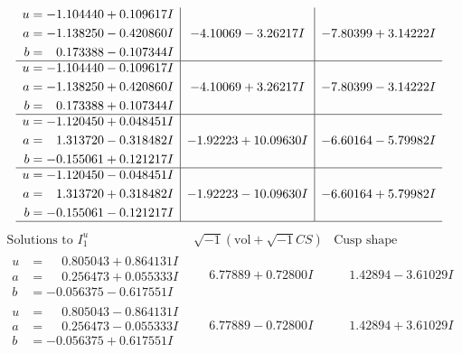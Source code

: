 \documentclass[1p]{elsarticle_modified}
\theoremstyle{definition}
\newcommand{\I}{\sqrt{-1}}
\begin{document}
$$\begin{array}{c|c|c}
\begin{aligned}
u &= -1.104440 + 0.109617 I \\
a &= -1.138250 - 0.420860 I \\
b &= \phantom{-}0.173388 - 0.107344 I\end{aligned}
 & -4.10069 - 3.26217 I & -7.80399 + 3.14222 I \\ \hline\begin{aligned}
u &= -1.104440 - 0.109617 I \\
a &= -1.138250 + 0.420860 I \\
b &= \phantom{-}0.173388 + 0.107344 I\end{aligned}
 & -4.10069 + 3.26217 I & -7.80399 - 3.14222 I \\ \hline\begin{aligned}
u &= -1.120450 + 0.048451 I \\
a &= \phantom{-}1.313720 - 0.318482 I \\
b &= -0.155061 + 0.121217 I\end{aligned}
 & -1.92223 + 10.09630 I & -6.60164 - 5.79982 I \\ \hline\begin{aligned}
u &= -1.120450 - 0.048451 I \\
a &= \phantom{-}1.313720 + 0.318482 I \\
b &= -0.155061 - 0.121217 I\end{aligned}
 & -1.92223 - 10.09630 I & -6.60164 + 5.79982 I\\
 \hline 
 \end{array}$$\newpage$$\begin{array}{c|c|c}  
\text{Solutions to }I^u_{1}& \I (\text{vol} + \sqrt{-1}CS) & \text{Cusp shape}\\
 \hline 
\begin{aligned}
u &= \phantom{-}0.805043 + 0.864131 I \\
a &= \phantom{-}0.256473 + 0.055333 I \\
b &= -0.056375 - 0.617551 I\end{aligned}
 & \phantom{-}6.77889 + 0.72800 I & \phantom{-}1.42894 - 3.61029 I \\ \hline\begin{aligned}
u &= \phantom{-}0.805043 - 0.864131 I \\
a &= \phantom{-}0.256473 - 0.055333 I \\
b &= -0.056375 + 0.617551 I\end{aligned}
 & \phantom{-}6.77889 - 0.72800 I & \phantom{-}1.42894 + 3.61029 I \\ \hline\begin{aligned}

\end{aligned}
\end{array}$$
\end{document}
